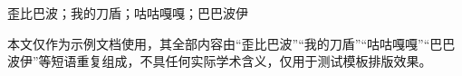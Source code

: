 \begin{abstract}
歪比巴波 歪比巴波 歪比巴波 歪比巴波 歪比巴波 歪比巴波 歪比巴波 歪比巴波 歪比巴波 歪比巴波。

我的刀盾 我的刀盾 我的刀盾 我的刀盾 我的刀盾 我的刀盾 我的刀盾 我的刀盾 我的刀盾 我的刀盾。

咕咕嘎嘎 咕咕嘎嘎 咕咕嘎嘎 咕咕嘎嘎 咕咕嘎嘎 咕咕嘎嘎 咕咕嘎嘎 咕咕嘎嘎 咕咕嘎嘎 咕咕嘎嘎。

巴巴波伊 巴巴波伊 巴巴波伊 巴巴波伊 巴巴波伊 巴巴波伊 巴巴波伊 巴巴波伊 巴巴波伊 巴巴波伊。
\end{abstract}

\begin{keywords}
歪比巴波；我的刀盾；咕咕嘎嘎；巴巴波伊
\end{keywords}

\begin{impactstatement}
本文仅作为示例文档使用，其全部内容由“歪比巴波”“我的刀盾”“咕咕嘎嘎”“巴巴波伊”等短语重复组成，不具任何实际学术含义，仅用于测试模板排版效果。
\end{impactstatement}

\vspace{2.0ex}
